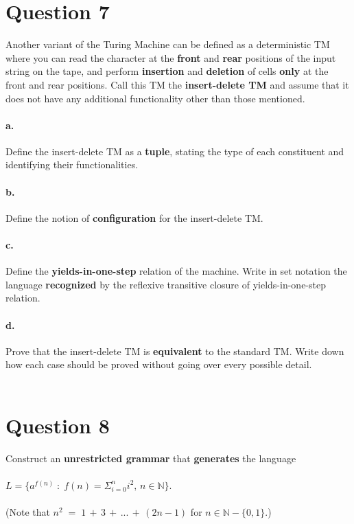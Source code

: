 \documentclass[fleqn,12pt]{article}
\begin{document}
\pagebreak 

\section*{Question 7 \hfill {}} 
Another variant of the Turing Machine can be defined as a deterministic TM where you can read the character at the \textbf{front} and \textbf{rear} positions of the input string on the tape, and perform \textbf{insertion} and \textbf{deletion} of cells \textbf{only} at the front and rear positions. Call this TM the \textbf{insert-delete TM} and assume that it does not have any additional functionality other than those mentioned. 
\paragraph{a.} Define the insert-delete TM as a \textbf{tuple}, stating the type of each constituent and identifying their functionalities. \hfill {}
\paragraph{b.} Define the notion of \textbf{configuration} for the insert-delete TM. \hfill {}
\paragraph{c.} Define the \textbf{yields-in-one-step} relation of the machine. Write in set notation the language \textbf{recognized} by the reflexive transitive closure of yields-in-one-step relation.  \hfill {}
\paragraph{d.} Prove that the insert-delete TM is \textbf{equivalent} to the standard TM. Write down how each case should be proved without going over every possible detail.\hfill {}
\noindent \\\\

\section*{Question 8 \hfill {}} 

Construct an \textbf{unrestricted grammar} that \textbf{generates} the language \\\\$L = \{ a^{f(n)}\;:\;f(n) = \Sigma_{i=0}^n i^2,\,n\in\mathbb{N}\}$. \\\\
(Note that $n^2 \;=\; 1 \,+\, 3 \,+\, ... \,+\, (2n-1)$ for $n \in \mathbb{N}-\{0,1\}$.)
\noindent \\\\
\end{document}
